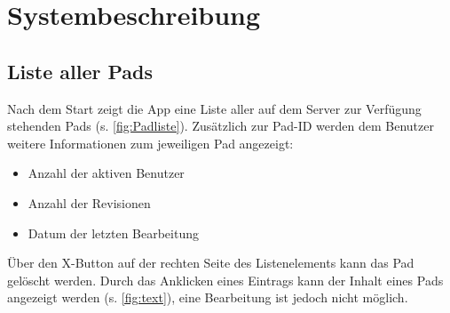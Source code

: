 \section{Systembeschreibung}
\subsection{Liste aller Pads}
Nach dem Start zeigt die App eine Liste aller auf dem Server zur Verfügung stehenden Pads (s. \autoref{fig:Padliste}).
Zusätzlich zur Pad-ID werden dem Benutzer weitere Informationen zum jeweiligen Pad angezeigt:

\begin{itemize}
	\item Anzahl der aktiven Benutzer
	\item Anzahl der Revisionen
	\item Datum der letzten Bearbeitung
\end{itemize}

Über den X-Button auf der rechten Seite des Listenelements kann das Pad gelöscht werden.
Durch das Anklicken eines Eintrags kann der Inhalt eines Pads angezeigt werden (s. \autoref{fig:text}), eine Bearbeitung ist jedoch nicht möglich.

